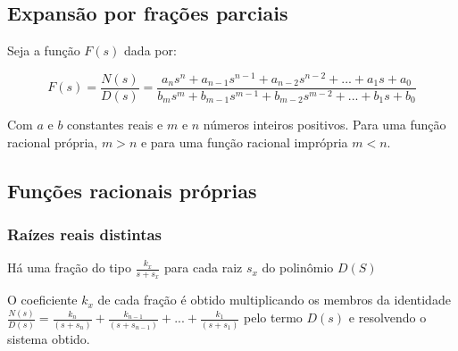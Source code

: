 \documentclass[12pt,fleqn]{book} %
\begin{document}
        \subsection{Expansão por frações parciais}
        
        Seja a função $F(s)$ dada por:
        
\begin{equation}
F(s) = \frac{N(s)}{D(s)} = \frac{a_n s^n+a_{n-1} s^{n-1}+a_{n-2} s^{n-2}+...+a_1 s+a_0}{b_m s^m+b_{m-1} s^{m-1}+b_{m-2} s^{m-2}+...+b_1 s+b_0}
\end{equation}

Com $a$ e $b$ constantes reais e $m$ e $n$ números inteiros positivos. Para uma função racional própria, $m>n$ e para uma função racional imprópria $m<n$.

\subsection{Funções racionais próprias}

\subsubsection{Raízes reais distintas}

\begin{remark}
	Há uma fração do tipo $\frac{k_x}{s+s_x}$ para cada raiz $s_x$ do polinômio $D(S)$
\end{remark}

\begin{remark}
O coeficiente $k_x$ de cada fração é obtido multiplicando os membros da identidade $\frac{N(s)}{D(s)}= \frac{k_n}{(s+s_n)}+\frac{k_{n-1}}{(s+s_{n-1})}+...+\frac{k_1}{(s+s_1)}$ pelo termo $D(s)$ e resolvendo o sistema obtido.
\end{remark}
\end{document}
